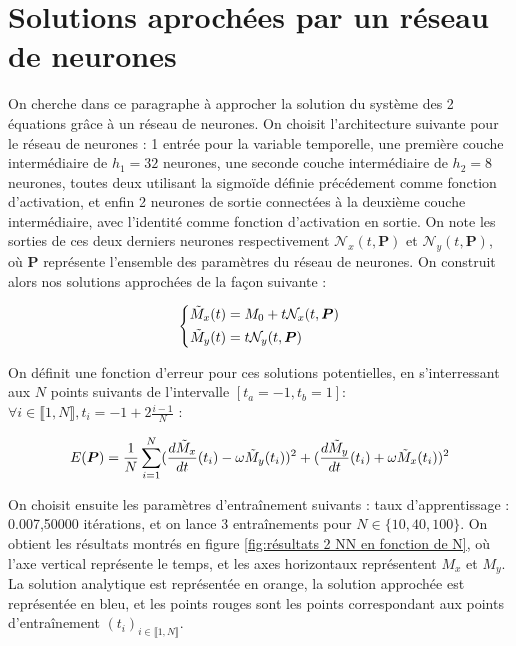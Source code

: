 \documentclass[12pt]{report}
\begin{document}
\section{Solutions aprochées par un réseau de neurones}

On cherche dans ce paragraphe à approcher la solution du système des 2 équations grâce à un réseau de neurones.
On choisit l'architecture suivante pour le réseau de neurones : 
1 entrée pour la variable temporelle, une première couche intermédiaire de $h_1=32$ neurones, une seconde couche intermédiaire de $h_2=8$ neurones, toutes deux utilisant la sigmoïde définie précédement comme fonction d'activation, et enfin 2 neurones de sortie connectées à la deuxième couche intermédiaire, avec l'identité comme fonction d'activation en sortie.
On note les sorties de ces deux derniers neurones respectivement $\mathcal{N}_x(t, \bm{P})$ et $\mathcal{N}_y(t, \bm{P})$, où $\bm{P}$ représente l'ensemble des paramètres du réseau de neurones.
On construit alors nos solutions approchées de la façon suivante :

\begin{equation}
    \left\{
        \begin{aligned}
            \Tilde{M}_x(t) &= M_0+ t\mathcal{N}_x(t, \bm{P}) \\
            \Tilde{M}_y(t) &= t\mathcal{N}_y(t, \bm{P})
        \end{aligned}
    \right.
    \label{eq:solution 2_NN}
    \end{equation}

On définit une fonction d'erreur pour ces solutions potentielles, en s'interressant aux $N$ points suivants de l'intervalle $[t_a=-1, t_b=1]$: 
$\forall i \in\llbracket 1,N \rrbracket, t_i = -1 + 2\frac{i-1}{N} $ :

\begin{equation}
        E(\bm{P}) = \frac{1}{N}\sum_{i=1}^{N} (\frac{d\Tilde{M}_x}{dt}(t_i) - \omega \Tilde{M}_y(t_i))^2 + (\frac{d\Tilde{M}_y}{dt}(t_i) + \omega \Tilde{M}_x(t_i))^2
\label{eq:erreur 2_NN}
\end{equation}


On choisit ensuite les paramètres d'entraînement suivants : taux d'apprentissage : 0.007,50000 itérations, et on lance 3 entraînements pour $N \in \{10,40,100\}$. 
On obtient les résultats montrés en figure \ref{fig:résultats 2 NN en fonction de N}, où l'axe vertical représente le temps, et les axes horizontaux représentent $M_x$ et $M_y$. 
La solution analytique est représentée en orange, la solution approchée est représentée en bleu, et les points rouges sont les points correspondant aux points d'entraînement $(t_i)_{i \in \llbracket 1, N \rrbracket}$.
\end{document}
